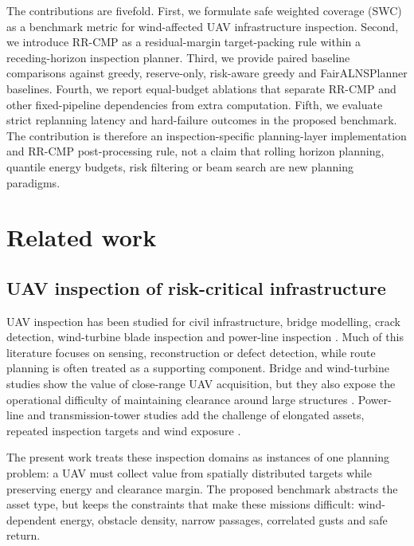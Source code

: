 \documentclass[preprint,12pt]{elsarticle}
\begin{document}
The contributions are fivefold. First, we formulate safe weighted coverage (SWC) as a benchmark metric for wind-affected UAV infrastructure inspection. Second, we introduce RR-CMP as a residual-margin target-packing rule within a receding-horizon inspection planner. Third, we provide paired baseline comparisons against greedy, reserve-only, risk-aware greedy and FairALNSPlanner baselines. Fourth, we report equal-budget ablations that separate RR-CMP and other fixed-pipeline dependencies from extra computation. Fifth, we evaluate strict replanning latency and hard-failure outcomes in the proposed benchmark. The contribution is therefore an inspection-specific planning-layer implementation and RR-CMP post-processing rule, not a claim that rolling horizon planning, quantile energy budgets, risk filtering or beam search are new planning paradigms.

\section{Related work}

\subsection{UAV inspection of risk-critical infrastructure}

UAV inspection has been studied for civil infrastructure, bridge modelling, crack detection, wind-turbine blade inspection and power-line inspection \cite{Shakhatreh_2019,Khaloo_2017,Dorafshan_Maguire_2018,Dorafshan_2018,Kim_2018,Car_2020,Zhang_2024,Ahmed_2024,Yin_2022}. Much of this literature focuses on sensing, reconstruction or defect detection, while route planning is often treated as a supporting component. Bridge and wind-turbine studies show the value of close-range UAV acquisition, but they also expose the operational difficulty of maintaining clearance around large structures \cite{Khaloo_2017,Car_2020,Zhang_2024}. Power-line and transmission-tower studies add the challenge of elongated assets, repeated inspection targets and wind exposure \cite{Ahmed_2024,Wu_2022,Li_AStar_2024,Li_2024}.

The present work treats these inspection domains as instances of one planning problem: a UAV must collect value from spatially distributed targets while preserving energy and clearance margin. The proposed benchmark abstracts the asset type, but keeps the constraints that make these missions difficult: wind-dependent energy, obstacle density, narrow passages, correlated gusts and safe return.
\end{document}
